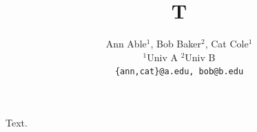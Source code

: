 \documentclass{article}
\title{T}
\author{\begin{tabular}{c}
Ann Able$^{1}$, Bob Baker$^{2}$, Cat Cole$^{1}$ \\
$^{1}$Univ A \quad $^{2}$Univ B \\
\texttt{\{ann,cat\}@a.edu, bob@b.edu}
\end{tabular}}
\begin{document}
\maketitle
Text.
\end{document}
